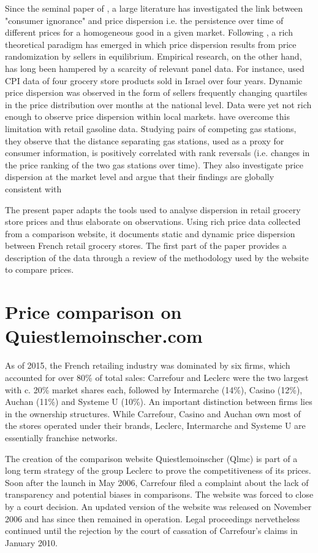 \documentclass[english]{article}
\begin{document}
Since the seminal paper of \cite{STI61}, a large literature has investigated the link between "consumer ignorance" and price dispersion i.e. the persistence over time of different prices for a homogeneous good in a given market. Following \cite{VAR80}, a rich theoretical paradigm has emerged in which price dispersion results from price randomization by sellers in equilibrium. Empirical research, on the other hand, has long been hampered by a scarcity of relevant panel data. For instance, \cite{LAC02} used CPI data of four grocery store products sold in Israel over four years. Dynamic price dispersion was observed in the form of sellers frequently changing quartiles in the price distribution over months at the national level. Data were yet not rich enough to observe price dispersion within local markets. \cite{TAP11} have overcome this limitation with retail gasoline data. Studying pairs of competing gas stations, they observe that the distance separating gas stations, used as a proxy for consumer information, is positively correlated with rank reversals (i.e. changes in the price ranking of the two gas stations over time). They also investigate price dispersion at the market level and argue that their findings are globally consistent with \cite{VAR80}

The present paper adapts the tools used \cite{TAP11} to analyse dispersion in retail grocery store prices and thus elaborate on \cite{LAC02} observations. Using rich price data collected from a comparison website, it documents static and dynamic price dispersion between French retail grocery stores. The first part of the paper provides a description of the data through a review of the methodology used by the website to compare prices.

\section{Price comparison on Quiestlemoinscher.com}

As of 2015, the French retailing industry was dominated by six firms, which accounted for over 80\% of total sales: Carrefour and Leclerc were the two largest with c. 20\% market shares each, followed by Intermarche (14\%), Casino (12\%), Auchan (11\%) and Systeme U (10\%). An important distinction between firms lies in the ownership structures. While Carrefour, Casino and Auchan own most of the stores operated under their brands, Leclerc, Intermarche and Systeme U are essentially franchise networks.

The creation of the comparison website Quiestlemoinscher (Qlmc) is part of a long term strategy of the group Leclerc to prove the competitiveness of its prices. Soon after the launch in May 2006, Carrefour filed a complaint about the lack of transparency and potential biases in comparisons. The website was forced to close by a court decision. An updated version of the website was released on November 2006 and has since then remained in operation. Legal proceedings nervetheless continued until the rejection by the court of cassation of Carrefour's claims in January 2010.
\end{document}
